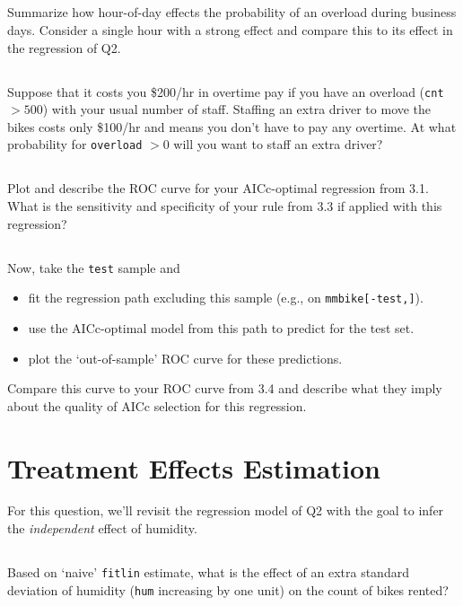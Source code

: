 \documentclass[12pt]{article}
\begin{document}
\subsection{} Summarize how hour-of-day effects the probability of an overload during business days.
Consider a single hour with a strong effect and compare this to its effect in the regression of Q2. 

\subsection{} Suppose that it costs you \$200/hr in overtime pay if you have an overload (\texttt{cnt} $>500$) with your usual number of staff.  Staffing an extra driver to move the bikes costs only \$100/hr and means you don't have to pay any overtime.  At what probability for \texttt{overload} $>0$ will you want to staff an extra driver?  

\subsection{} Plot and describe the ROC curve for your AICc-optimal regression from 3.1.  What is the sensitivity and specificity of your rule from 3.3 if applied with this regression?

\subsection{} Now, take the \texttt{test} sample and
\begin{itemize}
\item fit the regression path excluding this sample (e.g., on \texttt{mmbike[-test,]}).
\item use the AICc-optimal model from this path to predict for the test set.
\item plot the `out-of-sample' ROC curve for these predictions.
\end{itemize}
Compare this curve to your ROC curve from 3.4 and describe what they imply about the quality of AICc selection for this regression.

\newpage
\section{Treatment Effects Estimation}

For this question, we'll revisit the regression model of Q2 with the goal to infer the {\it independent} effect of humidity. 

\subsection{} Based on `naive' \texttt{fitlin} estimate, what is the effect of an extra standard deviation of humidity (\texttt{hum} increasing by one unit) on the count of bikes rented?
\end{document}
